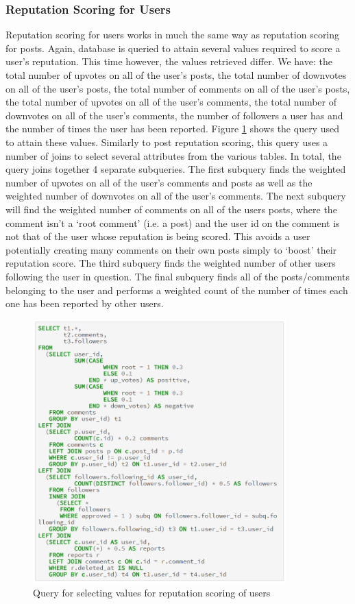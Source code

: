 \subsubsection{Reputation Scoring for Users}
Reputation scoring for users works in much the same way as reputation scoring for posts. Again, database is queried to attain several values required to score a user's reputation. This time however, the values retrieved differ. We have: the total number of upvotes on all of the user's posts, the total number of downvotes on all of the user's posts, the total number of comments on all of the user's posts, the total number of upvotes on all of the user's comments, the total number of downvotes on all of the user's comments, the number of followers a user has and the number of times the user has been reported. Figure \ref{fig:UserRepQuery} shows the query used to attain these values. Similarly to post reputation scoring, this query uses a number of joins to select several attributes from the various tables. In total, the query joins together 4 separate subqueries. The first subquery finds the weighted number of upvotes on all of the user's comments and posts as well as the weighted number of downvotes on all of the user's comments. The next subquery will find the weighted number of comments on all of the users posts, where the comment isn't a `root comment' (i.e. a post) and the user id on the comment is not that of the user whose reputation is being scored. This avoids a user potentially creating many comments on their own posts simply to `boost' their reputation score. The third subquery finds the weighted number of other users following the user in question. The final subquery finds all of the posts/comments belonging to the user and performs a weighted count of the number of times each one has been reported by other users.

\begin{figure}[H]
\centering
\includegraphics[height=4in]{Images/Implementation/UserRepQuery}
\caption{Query for selecting values for reputation scoring of users}
\label{fig:UserRepQuery}
\end{figure}


